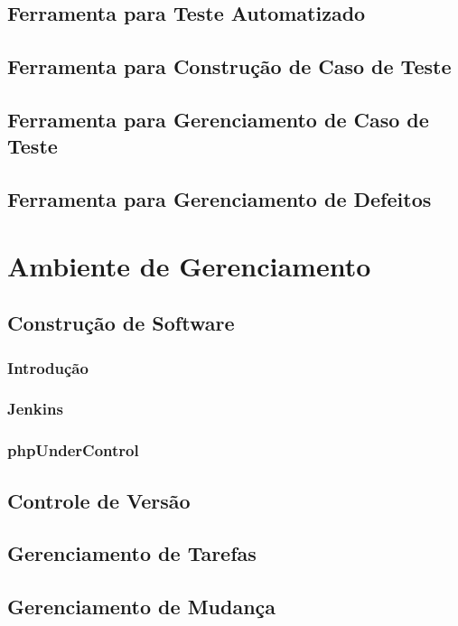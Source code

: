 \documentclass[12pt,a4paper]{article}
\begin{document}
	\subsection{Ferramenta para Teste Automatizado}
	\subsection{Ferramenta para Construção de Caso de Teste}
	\subsection{Ferramenta para Gerenciamento de Caso de Teste}
	\subsection{Ferramenta para Gerenciamento de Defeitos}
\section{Ambiente de Gerenciamento}
	\subsection{Construção de Software}
		\subsubsection{Introdução}
		\subsubsection{Jenkins}
		\subsubsection{phpUnderControl}
	\subsection{Controle de Versão}
	\subsection{Gerenciamento de Tarefas}
	\subsection{Gerenciamento de Mudança}
		
\end{document}

